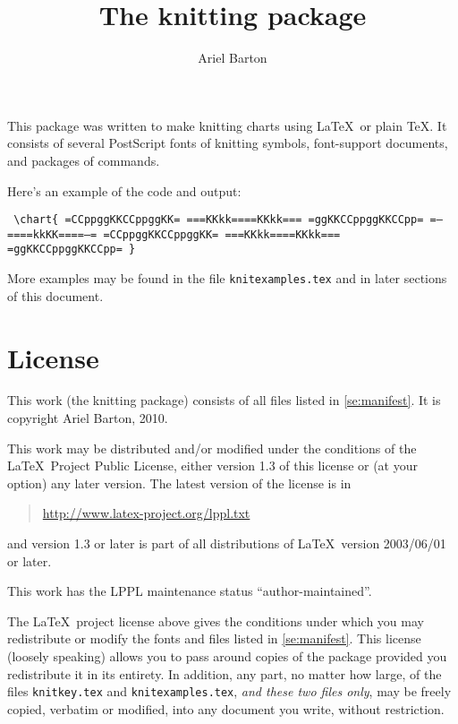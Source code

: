 \documentclass[draft]{amsart}
\title{The \textsf{knitting} package}
\author{Ariel Barton}
\begin{document}
\maketitle

This package was written to make knitting charts using \LaTeX\ or plain
\TeX. It consists of several PostScript fonts of knitting symbols,
font-support documents, and packages of commands.

Here's an example of the code and output:
\begin{center}
\begin{minipage}[b]{108pt}
\obeylines\parindent=0pt\tt 
\verb|\chart{|
=CCppggKKCCppggKK=
===KKkk====KKkk===
=ggKKCCppggKKCCpp=
=--====kkKK====--=
=CCppggKKCCppggKK=
===KKkk====KKkk===
=ggKKCCppggKKCCpp=
\verb|}|
\end{minipage}
\quad
\begin{minipage}[t]{220pt}

\end{minipage}
\end{center}

More examples may be found in the file \texttt{knitexamples.tex} and in 
later sections of this document.

\section{License}

This work (the \textsf{knitting} package) consists of all files listed 
in \autoref{se:manifest}. It is copyright Ariel Barton, 2010.

This work may be distributed and/or modified under the
conditions of the \LaTeX\ Project Public License, either
version 1.3 of this license or (at your option) any
later version.
The latest version of the license is in
\begin{quote}
\href {http://www.latex-project.org/lppl.txt} 
{http://www.latex-project.org/lppl.txt}
\end{quote}
and version 1.3 or later is part of all distributions of
\LaTeX\ version 2003/06/01 or later.

This work has the LPPL maintenance status ``author-maintained''.

The \LaTeX\ project license above gives the conditions under which you
may redistribute or modify the fonts and files listed in
\autoref{se:manifest}. This license (loosely speaking) allows you to
pass around copies of the package provided you redistribute it in its
entirety. In addition, any part, no matter how large, of the files
\texttt{knitkey.tex} and \texttt{knitexamples.tex}, \emph{and these two
files only}, may be freely copied, verbatim or modified, into any
document you write, without restriction.
\end{document}
